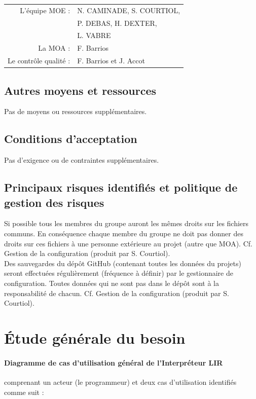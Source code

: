 \begin{center}
    \begin{tabular}{rl}
        L'équipe MOE :        & N. CAMINADE, S. COURTIOL, \\
        & P. DEBAS, H. DEXTER,      \\
        & L. VABRE                  \\
        La MOA :              & F. Barrios                \\
        Le contrôle qualité : & F. Barrios et J. Accot    \\
    \end{tabular}
\end{center}

\subsection{Autres moyens et ressources}
Pas de moyens ou ressources supplémentaires.

\subsection{Conditions d’acceptation}
Pas d’exigence ou de contraintes supplémentaires.

\subsection{Principaux risques identifiés et politique de gestion des risques}
Si possible tous les membres du groupe auront les mêmes droits sur
les fichiers communs. En conséquence chaque membre du groupe ne doit
pas donner des droits sur ces fichiers à une personne extérieure au
projet (autre que MOA). Cf. Gestion de la configuration (produit par
S. Courtiol).
\\Des sauvegardes du dépôt GitHub (contenant toutes les données du
projets) seront effectuées régulièrement (fréquence à définir) par le
gestionnaire de configuration. Toutes données qui ne sont pas dans le
dépôt sont à la responsabilité de chacun. Cf. Gestion de la
configuration (produit par S. Courtiol).

\section{Étude générale du besoin}
\paragraph{Diagramme de cas d'utilisation général de l'Interpréteur LIR}
comprenant un acteur (le programmeur) et deux cas d'utilisation
identifiés comme suit :
\\

